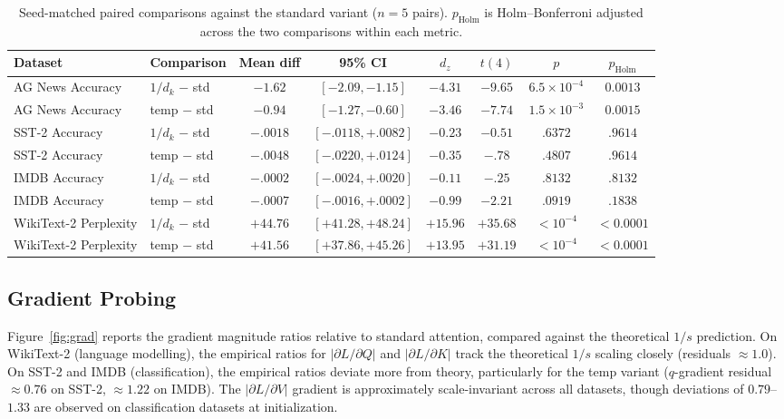 \documentclass[10pt,a4paper]{article}
\begin{document}
\begin{table}[t]
\centering
\caption{Seed-matched paired comparisons against the standard variant ($n = 5$ pairs). $p_{\text{Holm}}$ is Holm--Bonferroni adjusted across the two comparisons within each metric.}\label{tab:paired}
\footnotesize
\begin{tabular*}{\textwidth}{@{\extracolsep{\fill}} llcccccc@{}}
\toprule
Dataset & Comparison & Mean diff & 95\% CI & $d_z$ & $t(4)$ & $p$ & $p_{\text{Holm}}$ \\
\midrule
AG News Accuracy & $1/d_k$ $-$ std & $-1.62$ & $[-2.09, -1.15]$ & $-4.31$ & $-9.65$ & $6.5\times10^{-4}$ & $0.0013$ \\
AG News Accuracy & temp $-$ std & $-0.94$ & $[-1.27, -0.60]$ & $-3.46$ & $-7.74$ & $1.5\times10^{-3}$ & $0.0015$ \\
\midrule
SST-2 Accuracy & $1/d_k$ $-$ std & $-.0018$ & $[-.0118, +.0082]$ & $-0.23$ & $-0.51$ & $.6372$ & $.9614$ \\
SST-2 Accuracy & temp $-$ std & $-.0048$ & $[-.0220, +.0124]$ & $-0.35$ & $-.78$ & $.4807$ & $.9614$ \\
\midrule
IMDB Accuracy & $1/d_k$ $-$ std & $-.0002$ & $[-.0024, +.0020]$ & $-0.11$ & $-.25$ & $.8132$ & $.8132$ \\
IMDB Accuracy & temp $-$ std & $-.0007$ & $[-.0016, +.0002]$ & $-0.99$ & $-2.21$ & $.0919$ & $.1838$ \\
\midrule
WikiText-2 Perplexity & $1/d_k$ $-$ std & $+44.76$ & $[+41.28, +48.24]$ & $+15.96$ & $+35.68$ & $<10^{-4}$ & $<0.0001$ \\
WikiText-2 Perplexity & temp $-$ std & $+41.56$ & $[+37.86, +45.26]$ & $+13.95$ & $+31.19$ & $<10^{-4}$ & $<0.0001$ \\
\bottomrule
\end{tabular*}
\end{table}

\subsection{Gradient Probing}

Figure~\ref{fig:grad} reports the gradient magnitude ratios relative to standard attention, compared against the theoretical $1/s$ prediction. On WikiText-2 (language modelling), the empirical ratios for $|\partial L/\partial Q|$ and $|\partial L/\partial K|$ track the theoretical $1/s$ scaling closely (residuals $\approx 1.0$). On SST-2 and IMDB (classification), the empirical ratios deviate more from theory, particularly for the temp variant ($q$-gradient residual $\approx 0.76$ on SST-2, $\approx 1.22$ on IMDB). The $|\partial L/\partial V|$ gradient is approximately scale-invariant across all datasets, though deviations of $0.79$--$1.33$ are observed on classification datasets at initialization.
\end{document}
